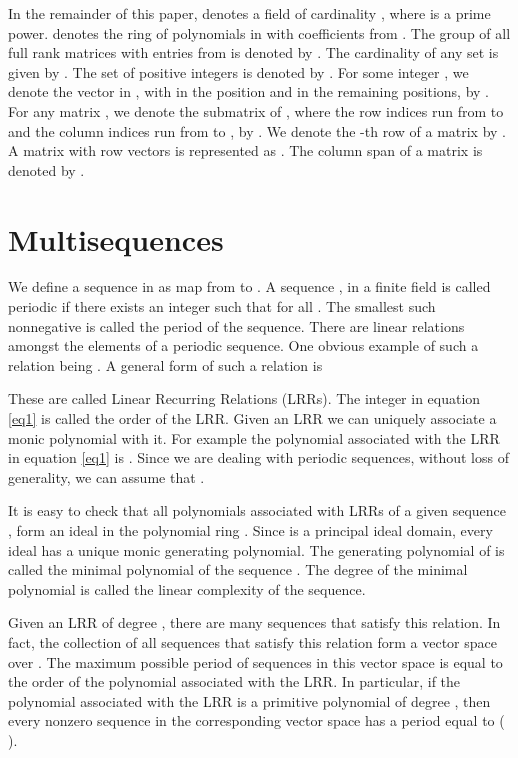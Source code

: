 \documentclass[letterpaper, 12 pt]{article}  \usepackage{amssymb}
\begin{document}
In the remainder of this paper,  denotes a field of cardinality , where
 is a prime power.  denotes the ring of polynomials in  with
coefficients from . The group of all full rank  matrices with
entries from  is denoted by . The cardinality of any set
 is given by . The set of positive integers is denoted by
.
For some integer , we denote the vector in
, with  in the  position and  in the remaining positions,
by . For any matrix , we denote the submatrix of , where
 the row indices run from  to  and the column indices run from  to
 , by . We denote the -th row of a matrix by . A matrix with row vectors  is represented as . The column span of a
matrix  is
denoted by . 
\section{Multisequences }
\label{Multisequences}






We define a sequence  in  as map from  to . 
A sequence , in a finite field 
is called periodic if there exists an integer  such that  for
all . 
The smallest such nonnegative  is called the period of the sequence. There
are linear relations amongst the elements of a periodic sequence. One obvious
example of such a relation being . A general form of such a
relation is
{\small

}
These are called  Linear Recurring Relations (LRRs). The integer  in equation
\eqref{eq1} is called the
order of the LRR. Given an LRR we can uniquely associate a monic polynomial
with it. For example the polynomial associated with the LRR in equation
\eqref{eq1} is .
Since we are dealing with periodic sequences, without loss of generality, we can
assume that   \cite[Theorem 6.11]{lidl}.

It is easy to check that all polynomials associated with LRRs of a given
sequence , form an ideal  in the polynomial ring .
Since  is a principal ideal domain, every ideal has a unique monic
generating polynomial. The generating polynomial of  is called
the minimal polynomial of the sequence .
The degree of the minimal polynomial is called the linear complexity of the
sequence. 

Given an LRR of degree , there are many sequences that satisfy this relation.
In fact, the collection of all sequences that satisfy this relation form a
vector space over . The maximum possible period of sequences in this
vector space is equal to the order of the polynomial associated with the LRR. In
particular, if the polynomial associated with 
the LRR is a primitive polynomial of degree , then every nonzero sequence in
the corresponding vector space has a period equal to  ( \cite[Theorem
6.33]{lidl}).
\end{document}
